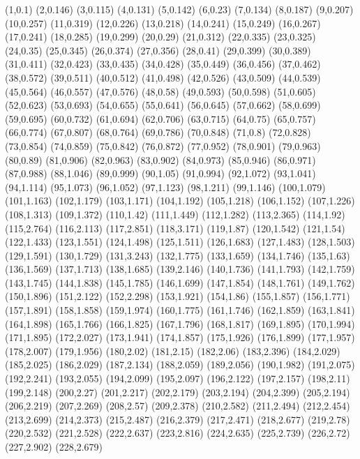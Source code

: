 (1,0.1)
(2,0.146)
(3,0.115)
(4,0.131)
(5,0.142)
(6,0.23)
(7,0.134)
(8,0.187)
(9,0.207)
(10,0.257)
(11,0.319)
(12,0.226)
(13,0.218)
(14,0.241)
(15,0.249)
(16,0.267)
(17,0.241)
(18,0.285)
(19,0.299)
(20,0.29)
(21,0.312)
(22,0.335)
(23,0.325)
(24,0.35)
(25,0.345)
(26,0.374)
(27,0.356)
(28,0.41)
(29,0.399)
(30,0.389)
(31,0.411)
(32,0.423)
(33,0.435)
(34,0.428)
(35,0.449)
(36,0.456)
(37,0.462)
(38,0.572)
(39,0.511)
(40,0.512)
(41,0.498)
(42,0.526)
(43,0.509)
(44,0.539)
(45,0.564)
(46,0.557)
(47,0.576)
(48,0.58)
(49,0.593)
(50,0.598)
(51,0.605)
(52,0.623)
(53,0.693)
(54,0.655)
(55,0.641)
(56,0.645)
(57,0.662)
(58,0.699)
(59,0.695)
(60,0.732)
(61,0.694)
(62,0.706)
(63,0.715)
(64,0.75)
(65,0.757)
(66,0.774)
(67,0.807)
(68,0.764)
(69,0.786)
(70,0.848)
(71,0.8)
(72,0.828)
(73,0.854)
(74,0.859)
(75,0.842)
(76,0.872)
(77,0.952)
(78,0.901)
(79,0.963)
(80,0.89)
(81,0.906)
(82,0.963)
(83,0.902)
(84,0.973)
(85,0.946)
(86,0.971)
(87,0.988)
(88,1.046)
(89,0.999)
(90,1.05)
(91,0.994)
(92,1.072)
(93,1.041)
(94,1.114)
(95,1.073)
(96,1.052)
(97,1.123)
(98,1.211)
(99,1.146)
(100,1.079)
(101,1.163)
(102,1.179)
(103,1.171)
(104,1.192)
(105,1.218)
(106,1.152)
(107,1.226)
(108,1.313)
(109,1.372)
(110,1.42)
(111,1.449)
(112,1.282)
(113,2.365)
(114,1.92)
(115,2.764)
(116,2.113)
(117,2.851)
(118,3.171)
(119,1.87)
(120,1.542)
(121,1.54)
(122,1.433)
(123,1.551)
(124,1.498)
(125,1.511)
(126,1.683)
(127,1.483)
(128,1.503)
(129,1.591)
(130,1.729)
(131,3.243)
(132,1.775)
(133,1.659)
(134,1.746)
(135,1.63)
(136,1.569)
(137,1.713)
(138,1.685)
(139,2.146)
(140,1.736)
(141,1.793)
(142,1.759)
(143,1.745)
(144,1.838)
(145,1.785)
(146,1.699)
(147,1.854)
(148,1.761)
(149,1.762)
(150,1.896)
(151,2.122)
(152,2.298)
(153,1.921)
(154,1.86)
(155,1.857)
(156,1.771)
(157,1.891)
(158,1.858)
(159,1.974)
(160,1.775)
(161,1.746)
(162,1.859)
(163,1.841)
(164,1.898)
(165,1.766)
(166,1.825)
(167,1.796)
(168,1.817)
(169,1.895)
(170,1.994)
(171,1.895)
(172,2.027)
(173,1.941)
(174,1.857)
(175,1.926)
(176,1.899)
(177,1.957)
(178,2.007)
(179,1.956)
(180,2.02)
(181,2.15)
(182,2.06)
(183,2.396)
(184,2.029)
(185,2.025)
(186,2.029)
(187,2.134)
(188,2.059)
(189,2.056)
(190,1.982)
(191,2.075)
(192,2.241)
(193,2.055)
(194,2.099)
(195,2.097)
(196,2.122)
(197,2.157)
(198,2.11)
(199,2.148)
(200,2.27)
(201,2.217)
(202,2.179)
(203,2.194)
(204,2.399)
(205,2.194)
(206,2.219)
(207,2.269)
(208,2.57)
(209,2.378)
(210,2.582)
(211,2.494)
(212,2.454)
(213,2.699)
(214,2.373)
(215,2.487)
(216,2.379)
(217,2.471)
(218,2.677)
(219,2.78)
(220,2.532)
(221,2.528)
(222,2.637)
(223,2.816)
(224,2.635)
(225,2.739)
(226,2.72)
(227,2.902)
(228,2.679)
